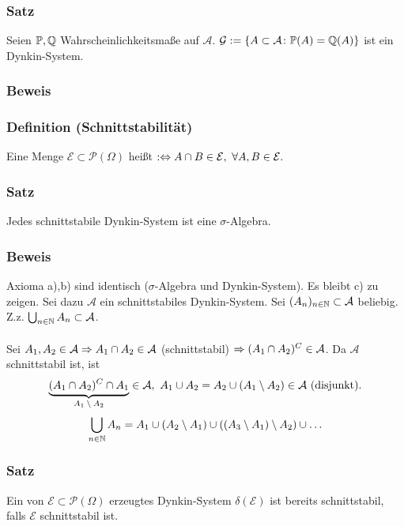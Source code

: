 \subsubsection{Satz}
Seien $\mathbb{P},\mathbb{Q}$ Wahrscheinlichkeitsma\ss{}e auf $\mathcal{A}$. $\mathcal{G}:=\{A\subset\mathcal{A}\colon\mathbb{P}(A)=\mathbb{Q}(A)\}$ ist ein Dynkin-System.
\subsubsection{Beweis}
\subsubsection{Definition (Schnittstabilit\"at)}
Eine Menge $\mathcal{E}\subset\mathcal{P}(\Omega)$ hei\ss{}t  $:\Leftrightarrow A\cap B\in\mathcal{E},\ \forall A,B\in\mathcal{E}.$
\subsubsection{Satz}
Jedes schnittstabile Dynkin-System ist eine $\sigma$-Algebra.
\subsubsection{Beweis}
Axioma a),b) sind identisch ($\sigma$-Algebra und Dynkin-System). Es bleibt c) zu zeigen. Sei dazu $\mathcal{A}$ ein schnittstabiles Dynkin-System. Sei $(A_n)_{n\in\mathbb{N}}\subset\mathcal{A}$ beliebig. Z.z. $\bigcup_{n\in\mathbb{N}}A_n\subset\mathcal{A}$.
\\~\\
Sei $A_1,A_2\in\mathcal{A}\Rightarrow A_1\cap A_2\in\mathcal{A}$ (schnittstabil) $\Rightarrow(A_1\cap A_2)^C\in\mathcal{A}$. Da $\mathcal{A}$ schnittstabil ist, ist
\[\ubr{(A_1\cap A_2)^C\cap A_1}{$A_1\setminus A_2$}\in\mathcal{A},\ A_1\cup A_2=A_2\cup(A_1\setminus A_2)\in\mathcal{A}\ \text{(disjunkt)}.\]
\[\bigcup_{n\in\mathbb{N}}A_n=A_1\cup(A_2\setminus A_1)\cup((A_3\setminus A_1)\setminus A_2)\cup\ldots\]
\myqed{}
\subsubsection{Satz}
Ein von $\mathcal{E}\subset\mathcal{P}(\Omega)$ erzeugtes Dynkin-System $\delta(\mathcal{E})$ ist bereits schnittstabil, falls $\mathcal{E}$ schnittstabil ist.
